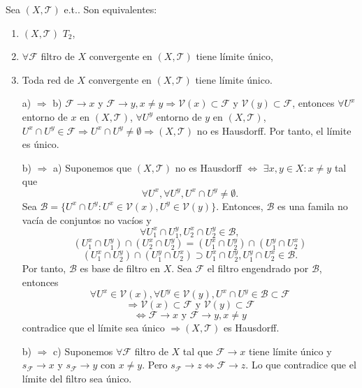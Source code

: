 \begin{prop}
  Sea $( X, \mathcal{T} )$ e.t.. Son equivalentes:
   \begin{enumerate}[label=(\roman*)]
    \item $( X, \mathcal{T} )$ $ T_{2}$,
    \item $\forall \mathcal{F}$ filtro de $X$ convergente en $( X, \mathcal{T} )$ tiene límite único,
    \item Toda red de $X$ convergente en $( X, \mathcal{T} )$ tiene límite único.
   \end{enumerate}
\end{prop}

\begin{dem}
  \begin{enumerate}[label=(\roman*)]
    \item []
    \item [a) $\Rightarrow$ b)] $\mathcal{F} \rightarrow x$ y $\mathcal{F} \rightarrow y, x \neq y \Rightarrow \mathcal{V}(x) \subset \mathcal{F}$ y $\mathcal{V}(y) \subset \mathcal{F}$, entonces $\forall U^{x}$ entorno de $x$ en $( X, \mathcal{T} )$, $\forall U^{y}$ entorno de $y$ en $( X, \mathcal{T} )$, $U^{x} \cap U^{y} \in \mathcal{F} \Rightarrow U^{x} \cap U^{y} \neq \emptyset \Rightarrow ( X, \mathcal{T} )$ no es Hausdorff. Por tanto, el límite es único.
    \item [b) $\Rightarrow$ a)] Suponemos que $( X, \mathcal{T} )$ no es Hausdorff $\Leftrightarrow$ $\exists x, y \in X: x \neq y$ tal que
      \[
        \forall U^{x}, \forall U^{y}, U^{x} \cap U^{y} \neq \emptyset.
      \]
      Sea $\mathcal{B} = \{ U^{x} \cap U^{y} : U^{x} \in \mathcal{V}(x), U^{y} \in \mathcal{V}(y) \}$. Entonces, $\mathcal{B}$ es una famila no vacía de conjuntos no vacíos y
      \[
        \forall U_{1}^{x} \cap U_{1}^{y}, U_{2}^{x} \cap U_{2}^{y} \in \mathcal{B},
      \]
      \[ 
        (U_{1}^{x} \cap U_{1}^{y}) \cap (U_{2}^{x} \cap U_{2}^{y}) = (U_{1}^{x} \cap U_{2}^{y}) \cap (U_{1}^{y} \cap U_{2}^{x})
      \] 
      \[ 
        (U_{1}^{x} \cap U_{2}^{y}) \cap (U_{1}^{y} \cap U_{2}^{x}) \supset U_{1}^{x} \cap U_{2}^{y}, U_{1}^{y} \cap U_{2}^{x} \in \mathcal{B}.
      \] 
      Por tanto, $\mathcal{B}$ es base de filtro en $X$. Sea $\mathcal{F}$ el filtro engendrado por $\mathcal{B}$, entonces
      \[
        \forall U^{x} \in \mathcal{V}(x), \forall U^{y} \in \mathcal{V}(y), U^{x} \cap U^{y} \in \mathcal{B} \subset \mathcal{F}
      \]
      \[ 
        \Rightarrow \mathcal{V}(x) \subset \mathcal{F} \text{ y } \mathcal{V}(y) \subset \mathcal{F}
      \] 
      \[ 
        \Leftrightarrow  \mathcal{F} \rightarrow x \text{ y } \mathcal{F} \rightarrow y, x \neq y
      \] 
      contradice que el límite sea único $\Rightarrow ( X, \mathcal{T} )$ es Hausdorff.
    \item [b) $\Rightarrow$ c)] Suponemos $ \forall \mathcal{F}$ filtro de $X$ tal que $\mathcal{F} \rightarrow x$ tiene límite único y $s_{\mathcal{F}} \rightarrow x$ y $s_{\mathcal{F}} \rightarrow y$ con $x \neq y$. Pero $s_{\mathcal{F}} \rightarrow z \Leftrightarrow \mathcal{F} \rightarrow z$. Lo que contradice que el límite del filtro sea único.


\end{enumerate}
\end{dem}
